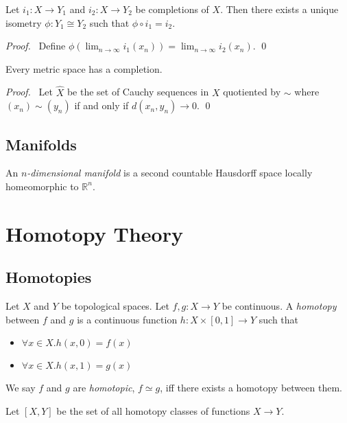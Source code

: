 \begin{prop}
Let $i_1 : X \rightarrow Y_1$ and $i_2 : X \rightarrow Y_2$ be completions of $X$. Then there exists a unique isometry $\phi : Y_1 \cong Y_2$ such that $\phi \circ i_1 = i_2$.
\end{prop}

\begin{proof}
\pf\ Define $\phi(\lim_{n \rightarrow \infty} i_1(x_n)) = \lim_{n \rightarrow \infty} i_2(x_n)$. \qed
\end{proof}

\begin{thm}
Every metric space has a completion.
\end{thm}

\begin{proof}
\pf\ Let $\hat{X}$ be the set of Cauchy sequences in $X$ quotiented by $\sim$ where $(x_n) \sim (y_n)$ if and only if $d(x_n, y_n) \rightarrow 0$. \qed
\end{proof}

\section{Manifolds}

\begin{df}[Manifold]
An \emph{$n$-dimensional manifold} is a second countable Hausdorff space locally homeomorphic to $\mathbb{R}^n$.
\end{df}

\chapter{Homotopy Theory}

\section{Homotopies}

\begin{df}[Homotopy]
Let $X$ and $Y$ be topological spaces. Let $f,g : X \rightarrow Y$ be continuous. A \emph{homotopy} between $f$ and $g$ is a continuous function $h : X \times [0,1] \rightarrow Y$ such that
\begin{itemize}
\item $\forall x \in X. h(x,0) = f(x)$
\item $\forall x \in X. h(x,1) = g(x)$
\end{itemize}
We say $f$ and $g$ are \emph{homotopic}, $f \simeq g$, iff there exists a homotopy between them.

Let $[X,Y]$ be the set of all homotopy classes of functions $X \rightarrow Y$.
\end{df}

